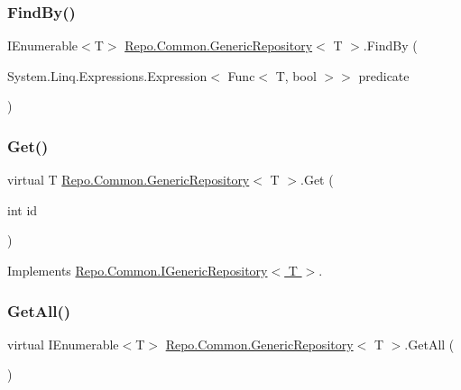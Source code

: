 \subsubsection{\texorpdfstring{Find\+By()}{FindBy()}}
{\footnotesize\ttfamily I\+Enumerable$<$T$>$ \hyperlink{class_repo_1_1_common_1_1_generic_repository}{Repo.\+Common.\+Generic\+Repository}$<$ T $>$.Find\+By (\begin{DoxyParamCaption}\item[{System.\+Linq.\+Expressions.\+Expression$<$ Func$<$ T, bool $>$$>$}]{predicate }\end{DoxyParamCaption})}

\mbox{\label{class_repo_1_1_common_1_1_generic_repository_ac3f609e57fb59eee8b0d8aaf2d1dd220}} 
\subsubsection{\texorpdfstring{Get()}{Get()}}
{\footnotesize\ttfamily virtual T \hyperlink{class_repo_1_1_common_1_1_generic_repository}{Repo.\+Common.\+Generic\+Repository}$<$ T $>$.Get (\begin{DoxyParamCaption}\item[{int}]{id }\end{DoxyParamCaption})\hspace{0.3cm}{\ttfamily [virtual]}}



Implements \hyperlink{interface_repo_1_1_common_1_1_i_generic_repository_acd283f18d8c2a73c52fa49601346e51d}{Repo.\+Common.\+I\+Generic\+Repository$<$ T $>$}.

\mbox{\label{class_repo_1_1_common_1_1_generic_repository_a819ba9c87b3246d17672f348c2162c7f}} 
\subsubsection{\texorpdfstring{Get\+All()}{GetAll()}}
{\footnotesize\ttfamily virtual I\+Enumerable$<$T$>$ \hyperlink{class_repo_1_1_common_1_1_generic_repository}{Repo.\+Common.\+Generic\+Repository}$<$ T $>$.Get\+All (\begin{DoxyParamCaption}{ }\end{DoxyParamCaption})\hspace{0.3cm}{\ttfamily [virtual]}}



